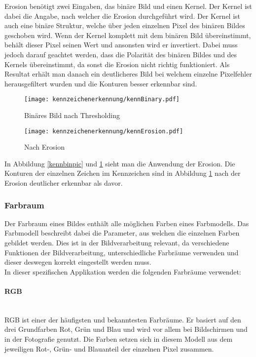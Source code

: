 Erosion benötigt zwei Eingaben, das binäre Bild und einen Kernel. Der Kernel ist dabei die Angabe, nach welcher die Erosion 
durchgeführt wird. Der Kernel ist auch eine binäre Struktur, welche über jeden einzelnen Pixel des binären Bildes geschoben 
wird. Wenn der Kernel komplett mit dem binären Bild übereinstimmt, behält dieser Pixel seinen Wert und ansonsten wird er 
invertiert. Dabei muss jedoch darauf geachtet werden, dass die Polarität des binären Bildes und des Kernels übereinstimmt, 
da sonst die Erosion nicht richtig funktioniert. Als Resultat erhält man danach ein deutlicheres Bild bei welchem einzelne 
Pixelfehler herausgefiltert wurden und die Konturen besser erkennbar sind.\\

\begin{figure}[htbp]
    \centering
    \begin{minipage}[t]{0.45\linewidth}
        \centering
        \texttt{[image: kennzeichenerkennung/kennBinary.pdf]}
        \caption{Binäres Bild nach Thresholding}
        \label{kennbinpic}
    \end{minipage}
    \hfill
    \begin{minipage}[t]{0.45\linewidth}
        \centering
        \texttt{[image: kennzeichenerkennung/kennErosion.pdf]}
        \caption{Nach Erosion}
        \label{eropic}
    \end{minipage}
\end{figure}

In Abbildung \ref{kennbinpic} und \ref{eropic} sieht man die Anwendung der Erosion. Die Konturen der einzelnen Zeichen im Kennzeichen sind in Abbildung 
\ref{eropic} nach der Erosion deutlicher erkennbar als davor.

\subsubsection{Farbraum}
Der Farbraum eines Bildes enthält alle möglichen Farben eines Farbmodells. Das Farbmodell beschreibt dabei die Parameter, aus 
welchen die einzelnen Farben gebildet werden. Dies ist in der Bildverarbeitung relevant, da verschiedene Funktionen der 
Bildverarbeitung, unterschiedliche Farbräume verwenden und dieser deswegen korrekt eingestellt werden muss.\\

In dieser spezifischen Applikation werden die folgenden Farbräume verwendet:

\paragraph{RGB}\mbox{}\\
RGB ist einer der häufigsten und bekanntesten Farbräume. Er basiert auf den drei Grundfarben Rot, Grün und Blau und wird vor 
allem bei Bildschirmen und in der Fotografie genutzt. Die Farben setzen sich in diesem Modell aus dem jeweiligen Rot-, Grün- 
und Blauanteil der einzelnen Pixel zusammen.

